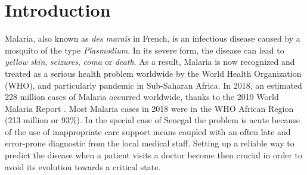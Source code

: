 \section{Introduction}\label{Introduction}
Malaria, also known as \emph{des marais} in French, is an infectious disease caused by a mosquito of the type \emph{Plasmodium}. 
In its severe form, the disease can lead to \emph{yellow skin}, \emph{seizures}, \emph{coma} or \emph{death}. 
As a result, Malaria is now recognized  and treated as a serious health problem worldwide by the World Health Organization (WHO), and particularly pandemic in Sub-Saharan Africa. 
In 2018, an estimated 228 million cases of Malaria occurred worldwide, thanks to the  2019 World Malaria Report \cite{19WMR}. Most Malaria cases in 2018 were in the WHO African Region (213 million or 93\%). In the special case of Senegal the problem is acute because of the use of inappropriate care support means coupled with an often late and error-prone diagnostic from the local medical staff. Setting up a reliable way to predict the disease when a patient visits a doctor become then crucial in order to avoid its evolution towards a critical state.

